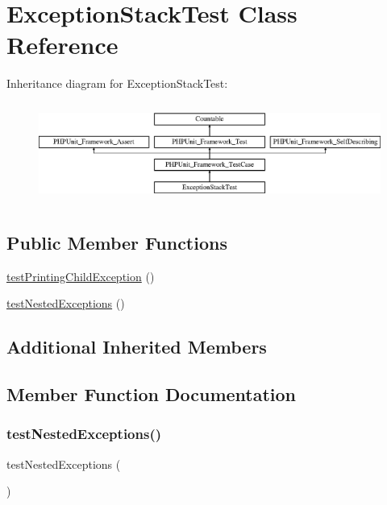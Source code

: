 \hypertarget{class_exception_stack_test}{}\section{Exception\+Stack\+Test Class Reference}
\label{class_exception_stack_test}
Inheritance diagram for Exception\+Stack\+Test\+:\begin{figure}[H]
\begin{center}
\leavevmode
\includegraphics[height=3.303835cm]{class_exception_stack_test}
\end{center}
\end{figure}
\subsection*{Public Member Functions}
\begin{DoxyCompactItemize}
\item 
\mbox{\hyperlink{class_exception_stack_test_ab3f5dbe6a82d8e030c57f085d5335647}{test\+Printing\+Child\+Exception}} ()
\item 
\mbox{\hyperlink{class_exception_stack_test_a71024a242838bebe22ef27700ee4983f}{test\+Nested\+Exceptions}} ()
\end{DoxyCompactItemize}
\subsection*{Additional Inherited Members}


\subsection{Member Function Documentation}
\mbox{\label{class_exception_stack_test_a71024a242838bebe22ef27700ee4983f}} 
\subsubsection{\texorpdfstring{test\+Nested\+Exceptions()}{testNestedExceptions()}}
{\footnotesize\ttfamily test\+Nested\+Exceptions (\begin{DoxyParamCaption}{ }\end{DoxyParamCaption})}

